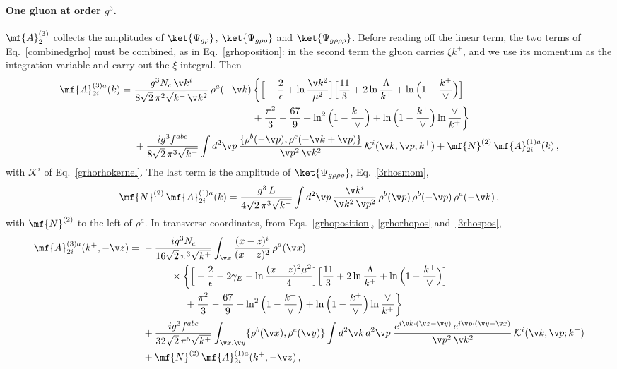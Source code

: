 \paragraph{One gluon at order $g^{3}$.}
$\mf{A}^{(3)}_{2}$ collects the amplitudes of $\ket{\Psi_{g\rho}}$, $\ket{\Psi_{g\rho\rho}}$ and
$\ket{\Psi_{g\rho\rho\rho}}$. Before reading off the linear term, the two terms of Eq.~\eqref{combinedgrho}
must be combined, as in Eq.~\eqref{grhoposition}: in the second term the gluon carries $\xi k^{+}$, and we
use its momentum as the integration variable and carry out the $\xi$ integral. Then
\begin{align}\label{A3coeffM}
\mf{A}^{(3)a}_{2i}(k)=\ &\frac{g^{3}N_{c}\,\v k^{i}}{8\sqrt{2}\,\pi^{2}\sqrt{k^{+}}\,\v k^{2}}\,\rho^{a}(-\v k)\,
\bigg\{\Big[-\frac{2}{\epsilon}+\ln\frac{\v k^{2}}{\mu^{2}}\Big]
\Big[\frac{11}{3}+2\ln\frac{\Lambda}{k^{+}}+\ln\Big(1-\frac{k^{+}}{\vee}\Big)\Big]\notag\\
&\hspace{4.2cm}+\frac{\pi^{2}}{3}-\frac{67}{9}+\ln^{2}\Big(1-\frac{k^{+}}{\vee}\Big)
+\ln\Big(1-\frac{k^{+}}{\vee}\Big)\ln\frac{\vee}{k^{+}}\bigg\}\notag\\
&+\frac{ig^{3}f^{abc}}{8\sqrt{2}\,\pi^{3}\sqrt{k^{+}}}\int d^{2}\v p\,
\frac{\{\rho^{b}(-\v p),\rho^{c}(-\v k+\v p)\}}{\v p^{2}\,\v k^{2}}\,\mathcal{K}^{i}(\v k,\v p;k^{+})
+\mf{N}^{(2)}\,\mf{A}^{(1)a}_{2i}(k)\,,
\end{align}
with $\mathcal{K}^{i}$ of Eq.~\eqref{grhorhokernel}. The last term is the amplitude of
$\ket{\Psi_{g\rho\rho\rho}}$, Eq.~\eqref{3rhosmom},
\begin{align}
\mf{N}^{(2)}\,\mf{A}^{(1)a}_{2i}(k)=\frac{g^{3}\,L}{4\sqrt{2}\,\pi^{3}\sqrt{k^{+}}}\int d^{2}\v p\,
\frac{\v k^{i}}{\v k^{2}\,\v p^{2}}\,\rho^{b}(\v p)\,\rho^{b}(-\v p)\,\rho^{a}(-\v k)\,,
\end{align}
with $\mf{N}^{(2)}$ to the left of $\rho^{a}$. In transverse coordinates, from Eqs.~\eqref{grhoposition},
\eqref{grhorhopos} and~\eqref{3rhospos},
\begin{align}\label{A3coeffX}
\mf{A}^{(3)a}_{2i}(k^{+},-\v z)=\ &-\frac{ig^{3}N_{c}}{16\sqrt{2}\,\pi^{3}\sqrt{k^{+}}}\int_{\v x}
\frac{(x-z)^{i}}{(x-z)^{2}}\,\rho^{a}(\v x)\notag\\
&\hspace{1cm}\times\bigg\{\Big[-\frac{2}{\epsilon}-2\gamma_{E}-\ln\frac{(x-z)^{2}\mu^{2}}{4}\Big]
\Big[\frac{11}{3}+2\ln\frac{\Lambda}{k^{+}}+\ln\Big(1-\frac{k^{+}}{\vee}\Big)\Big]\notag\\
&\hspace{1.5cm}+\frac{\pi^{2}}{3}-\frac{67}{9}+\ln^{2}\Big(1-\frac{k^{+}}{\vee}\Big)
+\ln\Big(1-\frac{k^{+}}{\vee}\Big)\ln\frac{\vee}{k^{+}}\bigg\}\notag\\
&+\frac{ig^{3}f^{abc}}{32\sqrt{2}\,\pi^{5}\sqrt{k^{+}}}\int_{\v x,\v y}\{\rho^{b}(\v x),\rho^{c}(\v y)\}
\int d^{2}\v k\,d^{2}\v p\;\frac{e^{i\v k\cdot(\v z-\v y)}\,e^{i\v p\cdot(\v y-\v x)}}{\v p^{2}\,\v k^{2}}\,
\mathcal{K}^{i}(\v k,\v p;k^{+})\notag\\
&+\mf{N}^{(2)}\,\mf{A}^{(1)a}_{2i}(k^{+},-\v z)\,,
\end{align}
